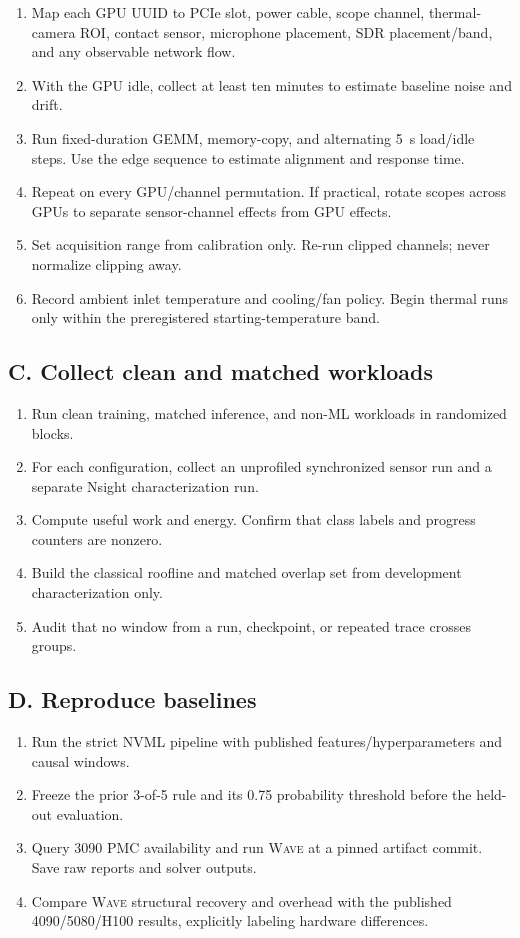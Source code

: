 \documentclass[sigplan,anonymous,review,nonacm]{acmart}
\newcommand{\wave}{\textsc{Wave}}
\begin{document}
\begin{enumerate}
\item Map each GPU UUID to PCIe slot, power cable, scope channel, thermal-camera ROI, contact sensor, microphone placement, SDR placement/band, and any observable network flow.
\item With the GPU idle, collect at least ten minutes to estimate baseline noise and drift.
\item Run fixed-duration GEMM, memory-copy, and alternating 5~s load/idle steps. Use the edge sequence to estimate alignment and response time.
\item Repeat on every GPU/channel permutation. If practical, rotate scopes across GPUs to separate sensor-channel effects from GPU effects.
\item Set acquisition range from calibration only. Re-run clipped channels; never normalize clipping away.
\item Record ambient inlet temperature and cooling/fan policy. Begin thermal runs only within the preregistered starting-temperature band.
\end{enumerate}

\subsection{C. Collect clean and matched workloads}

\begin{enumerate}
\item Run clean training, matched inference, and non-ML workloads in randomized blocks.
\item For each configuration, collect an unprofiled synchronized sensor run and a separate Nsight characterization run.
\item Compute useful work and energy. Confirm that class labels and progress counters are nonzero.
\item Build the classical roofline and matched overlap set from development characterization only.
\item Audit that no window from a run, checkpoint, or repeated trace crosses groups.
\end{enumerate}

\subsection{D. Reproduce baselines}

\begin{enumerate}
\item Run the strict NVML pipeline with published features/hyperparameters and causal windows.
\item Freeze the prior 3-of-5 rule and its 0.75 probability threshold before the held-out evaluation.
\item Query 3090 PMC availability and run \wave{} at a pinned artifact commit. Save raw reports and solver outputs.
\item Compare \wave{} structural recovery and overhead with the published 4090/5080/H100 results, explicitly labeling hardware differences.
\end{enumerate}
\end{document}
